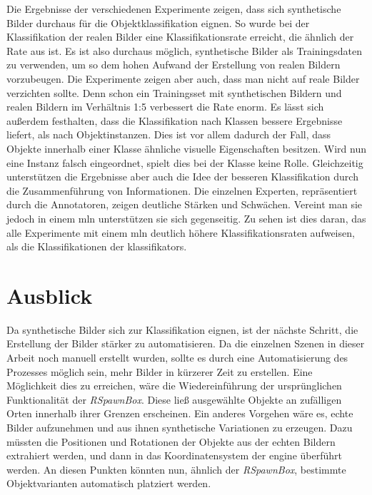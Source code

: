 Die Ergebnisse der verschiedenen Experimente zeigen, dass sich synthetische Bilder durchaus für die Objektklassifikation eignen. So wurde bei der Klassifikation der realen Bilder eine Klassifikationsrate erreicht, die ähnlich der Rate aus \cite{pr2looking} ist. Es ist also durchaus möglich, synthetische Bilder als Trainingsdaten zu verwenden, um so dem hohen Aufwand der Erstellung von realen Bildern vorzubeugen. Die Experimente zeigen aber auch, dass man nicht auf reale Bilder verzichten sollte. Denn schon ein Trainingsset mit synthetischen Bildern und realen Bildern im Verhältnis 1:5 verbessert die Rate enorm. Es lässt sich außerdem festhalten, dass die Klassifikation nach Klassen bessere Ergebnisse liefert, als nach Objektinstanzen. Dies ist vor allem dadurch der Fall, dass Objekte innerhalb einer Klasse ähnliche visuelle Eigenschaften besitzen. Wird nun eine Instanz falsch eingeordnet, spielt dies bei der Klasse keine Rolle. \newline
Gleichzeitig unterstützen die Ergebnisse aber auch die Idee der besseren Klassifikation durch die Zusammenführung von Informationen. Die einzelnen Experten, repräsentiert durch die \robosherlock Annotatoren, zeigen deutliche Stärken und Schwächen. Vereint man sie jedoch in einem \gls{mln} unterstützen sie sich gegenseitig. Zu sehen ist dies daran, das alle Experimente mit einem \gls{mln} deutlich höhere Klassifikationsraten aufweisen, als die Klassifikationen der \glspl{klassifikator}.

\section{Ausblick}
\label{chap:ausblick}   

Da synthetische Bilder sich zur Klassifikation eignen, ist der nächste Schritt, die Erstellung der Bilder stärker zu automatisieren. Da die einzelnen Szenen in dieser Arbeit noch manuell erstellt wurden, sollte es durch eine Automatisierung des Prozesses möglich sein, mehr Bilder in kürzerer Zeit zu erstellen. Eine Möglichkeit dies zu erreichen, wäre die Wiedereinführung der ursprünglichen Funktionalität der \textit{RSpawnBox}. Diese ließ ausgewählte Objekte an zufälligen Orten innerhalb ihrer Grenzen erscheinen. Ein anderes Vorgehen wäre es, echte Bilder aufzunehmen und aus ihnen synthetische Variationen zu erzeugen. Dazu müssten die Positionen und Rotationen der Objekte aus der echten Bildern extrahiert werden, und dann in das Koordinatensystem der \gls{engine} überführt werden. An diesen Punkten könnten nun, ähnlich der \textit{RSpawnBox}, bestimmte Objektvarianten automatisch platziert werden. \par 

